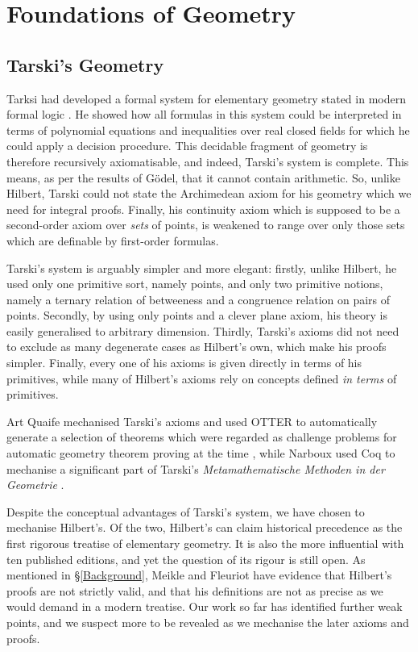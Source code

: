 \chapter{Foundations of Geometry}
\section{Tarski's Geometry}\label{OtherSystems}
Tarksi had developed a formal system for elementary geometry stated in modern formal logic \cite{TarskiGeometrySystem}. He showed how all formulas in this system could be interpreted in terms of polynomial equations and inequalities over real closed fields for which he could apply a decision procedure. This decidable fragment of geometry is therefore recursively axiomatisable, and indeed, Tarski's system is complete. This means, as per the results of G\"{o}del, that it cannot contain arithmetic. So, unlike Hilbert, Tarski could not state the Archimedean axiom for his geometry which we need for integral proofs. Finally, his continuity axiom which is supposed to be a second-order axiom over \emph{sets} of points, is weakened to range over only those sets which are definable by first-order formulas. 

Tarski's system is arguably simpler and more elegant: firstly, unlike Hilbert, he used only one primitive sort, namely points, and only two primitive notions, namely a ternary relation of betweeness and a congruence relation on pairs of points. Secondly, by using only points and a clever plane axiom, his theory is easily generalised to arbitrary dimension. Thirdly, Tarski's axioms did not need to exclude as many degenerate cases as Hilbert's own, which make his proofs simpler. Finally, every one of his axioms is given directly in terms of his primitives, while many of Hilbert's axioms rely on concepts defined \emph{in terms} of primitives. 

Art Quaife mechanised Tarski's axioms and used OTTER to automatically generate a selection of theorems which were regarded as challenge problems for automatic geometry theorem proving at the time \cite{QuaifeTarski}, while Narboux used Coq to mechanise a significant part of Tarski's \emph{Metamathematische Methoden in der Geometrie} \cite{NarbouxTarski}.

Despite the conceptual advantages of Tarski's system, we have chosen to mechanise Hilbert's. Of the two, Hilbert's can claim historical precedence as the first rigorous treatise of elementary geometry. It is also the more influential with ten published editions, and yet the question of its rigour is still open. As mentioned in \S\ref{Background}, Meikle and Fleuriot have evidence that Hilbert's proofs are not strictly valid, and that his definitions are not as precise as we would demand in a modern treatise. Our work so far has identified further weak points, and we suspect more to be revealed as we mechanise the later axioms and proofs. 